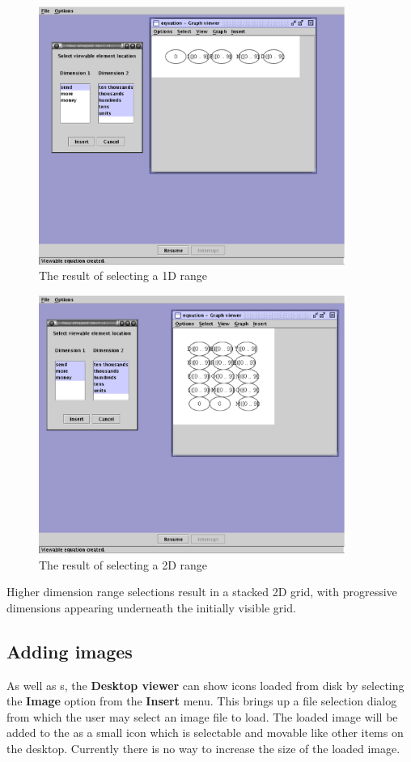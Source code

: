 \begin{figure}[htsp]
\centering
\includegraphics[width=10cm]{vcrangeselect1d}
\caption{The result of selecting a 1D range}
\label{fig:rangeselect1d}
\end{figure}

\begin{figure}[htsp]
\centering
\includegraphics[width=10cm]{vcrangeselect2d}
\caption{The result of selecting a 2D range}
\label{fig:rangeselect2d}
\end{figure}

Higher dimension range selections result in a stacked 2D grid, with
progressive dimensions appearing underneath the initially visible grid.

\subsection{Adding images}

As well as \viewlet{}s, the \textbf{Desktop viewer} can show icons
loaded from disk by selecting the \textbf{Image} option from the
\textbf{Insert} menu.  This brings up a file selection dialog from
which the user may select an image file to load.  The loaded image
will be added to the \viewer{} as a small icon which is selectable and
movable like other items on the desktop.  Currently there is no way to
increase the size of the loaded image.

